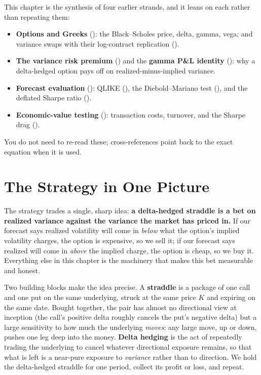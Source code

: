 \begin{prereq}[Background]
This chapter is the synthesis of four earlier strands, and it leans on each rather than repeating them:
\begin{itemize}
  \item \textbf{Options and Greeks} (): the Black--Scholes price, delta, gamma, vega; and variance swaps with their log-contract replication ().
  \item \textbf{The variance risk premium} () and the \textbf{gamma P\&L identity} (): why a delta-hedged option pays off on realized-minus-implied variance.
  \item \textbf{Forecast evaluation} (): QLIKE (), the Diebold--Mariano test (), and the deflated Sharpe ratio ().
  \item \textbf{Economic-value testing} (): transaction costs, turnover, and the Sharpe drag ().
\end{itemize}
You do not need to re-read these; cross-references point back to the exact equation when it is used.
\end{prereq}

\section{The Strategy in One Picture}
\label{sec:ivrv:picture}

The strategy trades a single, sharp idea: \textbf{a delta-hedged straddle is a bet on realized variance against the variance the market has priced in.} If our forecast says realized volatility will come in \emph{below} what the option's implied volatility charges, the option is expensive, so we sell it; if our forecast says realized will come in \emph{above} the implied charge, the option is cheap, so we buy it. Everything else in this chapter is the machinery that makes this bet measurable and honest.

Two building blocks make the idea precise. A \textbf{straddle} is a package of one call and one put on the same underlying, struck at the same price $K$ and expiring on the same date. Bought together, the pair has almost no directional view at inception (the call's positive delta roughly cancels the put's negative delta) but a large sensitivity to how much the underlying \emph{moves}: any large move, up or down, pushes one leg deep into the money. \textbf{Delta hedging} is the act of repeatedly trading the underlying to cancel whatever directional exposure remains, so that what is left is a near-pure exposure to \emph{variance} rather than to direction. We hold the delta-hedged straddle for one period, collect its profit or loss, and repeat.

